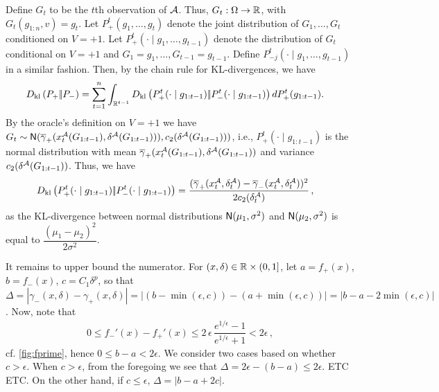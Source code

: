 Define $G_t$ to be the $t$th observation of $\mathcal{A}$. Thus, $G_t:\Omega \to \mathbb{R}$, with $G_t( g_{1:n}, v) = g_t$.
Let $P_+^t(g_1,\dots,g_t)$ denote the joint distribution of $G_1,\dots,G_t$ conditioned on $V=+1$.
Let $P_{+}^t(\cdot\mid g_1,\ldots,g_{t-1})$ denote the distribution of $G_t$ conditional on $V=+1$ and $G_1=g_1,\ldots,G_{t-1}=g_{t-1}$. Define  $P_{-j}^t(\cdot\mid g_1,\ldots,g_{t-1})$ in a similar fashion.
Then, by the chain rule for KL-divergences, we have
\begin{align}
\label{eq:dklchain}
&D_{\rm kl}\left({P_{+}} |\!| {P_{-}} \right)= \sum_{t=1}^n \int_{\mathbb{R}^{t-1}} D_{\rm kl}\left({P_{+}^t(\cdot\mid g_{1:t-1})} |\!| {P_{-}^t(\cdot\mid g_{1:t-1})} \right) d P_{+}^t( g_{1:t-1}).
\end{align}
By the oracle's definition on $V=+1$ we have
$G_t \sim  \mathsf{N}(\overline{\gamma}_{+}(x^{\mathcal{A}}_t(G_{1:t-1}),\delta^{\mathcal{A}}(G_{1:t-1}))),c_2(\delta^{\mathcal{A}}(G_{1:t-1})))$, i.e., 
$P_{+}^t(\cdot\mid g_{1:t-1})$ is the normal distribution with mean 
$\overline{\gamma}_{+}(x^{\mathcal{A}}_t(G_{1:t-1}),\delta^{\mathcal{A}}(G_{1:t-1}))$ and variance $c_2(\delta^{\mathcal{A}}(G_{1:t-1}))$.
Thus, we have
\begin{align*}
D_{\rm kl}\left({P_{+}^t(\cdot\mid g_{1:t-1})} |\!| {P_{-}^t(\cdot\mid g_{1:t-1})} \right)
& =\dfrac{(\overline{\gamma}_{+}(x_t^{\mathcal{A}},\delta_t^{\mathcal{A}}) - \overline{\gamma}_{-}(x_t^{\mathcal{A}},\delta_t^{\mathcal{A}}))^2}{2 c_2(\delta^{\mathcal{A}}_t)}\,,
\end{align*}
as the KL-divergence between normal distributions $\mathsf{N}(\mu_1,\sigma^2)$ and $\mathsf{N}(\mu_2,\sigma^2)$ is equal to $\dfrac{(\mu_1 - \mu_2)^2}{2 \sigma^2}$.

It remains to upper bound the numerator. For $(x,\delta)\in \mathbb{R}\times (0,1]$, let
$a = f_+(x)$, $b=f_-(x)$, $c= C_1 \delta^p$, 
so that $\Delta = |\gamma_-(x,\delta)-\gamma_+(x,\delta)| = | (b-\min(\epsilon,c)) -  (a+ \min(\epsilon,c)) |
= |b-a - 2\min(\epsilon,c)|$.
Now, note that 
\begin{align*}
0 \le f_-'(x) - f_+'(x) \le 2\,\epsilon \,\dfrac{e^{1/\epsilon}-1}{e^{1/\epsilon}+1} < 2\epsilon \,,
\end{align*}
cf. \cref{fig:fprime}, hence $0\le b-a <2\epsilon$. 
We consider two cases based on whether $c>\epsilon$.
When $c>\epsilon$, from the foregoing we see that $\Delta = 2\epsilon-(b-a)\le 2\epsilon$. ETC ETC.
On the other hand, if $c\le \epsilon$, $\Delta = |b-a+2c|$.

